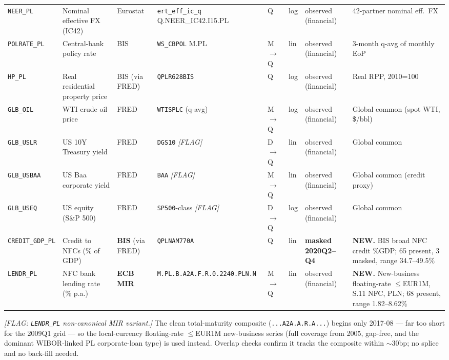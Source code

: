 {\begin{longtable}{@{}p{2.0cm}p{2.7cm}p{1.4cm}p{2.8cm}p{0.7cm}p{0.85cm}p{1.5cm}p{2.3cm}@{}}
\texttt{NEER\_PL}   & Nominal effective FX (IC42)   & Eurostat & \texttt{ert\_eff\_ic\_q} Q.NEER\_IC42.I15.PL            & Q & log & observed (financial) & 42-partner nominal eff.\ FX \\
\texttt{POLRATE\_PL}& Central-bank policy rate      & BIS & \texttt{WS\_CBPOL} M.PL                                 & M$\to$Q & lin & observed (financial) & 3-month q-avg of monthly EoP \\
\texttt{HP\_PL}     & Real residential property price & BIS (via FRED) & \texttt{QPLR628BIS}                          & Q & log & observed (financial) & Real RPP, 2010=100 \\
\texttt{GLB\_OIL}   & WTI crude oil price           & FRED & \texttt{WTISPLC} (q-avg)                               & M$\to$Q & log & observed (financial) & Global common (spot WTI, \$/bbl) \\
\texttt{GLB\_USLR}  & US 10Y Treasury yield         & FRED & \texttt{DGS10} \textit{[FLAG]}                          & D$\to$Q & lin & observed (financial) & Global common \\
\texttt{GLB\_USBAA} & US Baa corporate yield        & FRED & \texttt{BAA} \textit{[FLAG]}                            & M$\to$Q & lin & observed (financial) & Global common (credit proxy) \\
\texttt{GLB\_USEQ}  & US equity (S\&P 500)          & FRED & \texttt{SP500}-class \textit{[FLAG]}                    & D$\to$Q & log & observed (financial) & Global common \\
\texttt{CREDIT\_GDP\_PL} & Credit to NFCs (\% of GDP) & \textbf{BIS} (via FRED) & \texttt{QPLNAM770A}                       & Q & lin & \textbf{masked 2020Q2--Q4} & \textbf{NEW.} BIS broad NFC credit \%GDP; 65 present, 3 masked, range 34.7--49.5\% \\
\texttt{LENDR\_PL}  & NFC bank lending rate (\% p.a.) & \textbf{ECB MIR} & \texttt{M.\allowbreak PL.\allowbreak B.\allowbreak A2A.\allowbreak F.\allowbreak R.0.2240.\allowbreak PLN.\allowbreak N}                 & M$\to$Q & lin & observed (financial) & \textbf{NEW.} New-business floating-rate $\le$EUR1M, S.11 NFC, PLN; 68 present, range 1.82--8.62\% \\
\end{longtable}}

\noindent\textit{[FLAG: \texttt{LENDR\_PL} non-canonical MIR variant.]}
The clean total-maturity composite (\texttt{...\allowbreak A2A.\allowbreak A.\allowbreak R.\allowbreak A...}) begins only
2017-08 --- far too short for the 2009Q1 grid --- so the local-currency
floating-rate $\le$EUR1M new-business series (full coverage from 2005,
gap-free, and the dominant WIBOR-linked PL corporate-loan type) is used
instead.  Overlap checks confirm it tracks the composite within
$\sim$30bp; no splice and no back-fill needed.

